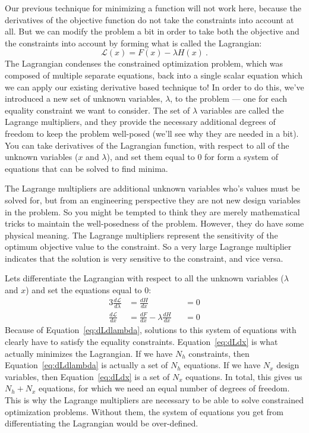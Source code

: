 \documentclass[conf]{new-aiaa}
\begin{document}
        Our previous technique for minimizing a function will not work here, because the derivatives of the objective function do not take the constraints into account at all. 
        But we can modify the problem a bit in order to take both the objective and the constraints into account by forming what is called the Lagrangian:  
        \begin{equation}
            \mathcal{L}(x) = F(x) - \lambda H(x) \ .
        \end{equation}
        The Lagrangian condenses the constrained optimization problem, which was composed of multiple separate equations, back into a single scalar equation which we can apply our existing derivative based technique to! 
        In order to do this, we've introduced a new set of unknown variables, $\lambda$, to the problem --- one for each equality constraint we want to consider. 
        The set of $\lambda$ variables are called the Lagrange multipliers, and they provide the necessary additional degrees of freedom to keep the problem well-posed (we'll see why they are needed in a bit). 
        You can take derivatives of the Lagrangian function, with respect to all of the unknown variables ($x$ and $\lambda$), and set them equal to 0 for form a system of equations that can be solved to find minima. 


        The Lagrange multipliers are additional unknown variables who's values must be solved for, but from an engineering perspective they are not new design variables in the problem. 
        So you might be tempted to think they are merely mathematical tricks to maintain the well-posedness of the problem. 
        However, they do have some physical meaning. 
        The Lagrange multipliers represent the sensitivity of the optimum objective value to the constraint. 
        So a very large Lagrange multiplier indicates that the solution is very sensitive to the constraint, and vice versa. 


        Lets differentiate the Lagrangian with respect to all the unknown variables ($\lambda$ and $x$) and set the equations equal to 0: 
        \begin{alignat}{3}
            \frac{d\mathcal{L}}{d\lambda} &= \frac{dH}{dx} &&= 0 \label{eq:dLdlambda} \\
            \frac{d\mathcal{L}}{dx} &= \frac{dF}{dx} - \lambda \frac{dH}{dx} &&= 0 \label{eq:dLdx}
        \end{alignat}
        Because of Equation~\eqref{eq:dLdlambda}, solutions to this system of equations with clearly have to satisfy the equality constraints. 
        Equation~\eqref{eq:dLdx} is what actually minimizes the Lagrangian.
        If we have $N_h$ constraints, then  Equation~\eqref{eq:dLdlambda} is actually a set of $N_h$ equations. 
        If we have $N_x$ design variables, then Equation~\eqref{eq:dLdx} is a set of $N_x$ equations. 
        In total, this gives us $N_h + N_x$ equations, for which we need an equal number of degrees of freedom. 
        This is why the Lagrange multipliers are necessary to be able to solve constrained optimization problems. 
        Without them, the system of equations you get from differentiating the Lagrangian would be over-defined. 
\end{document}
